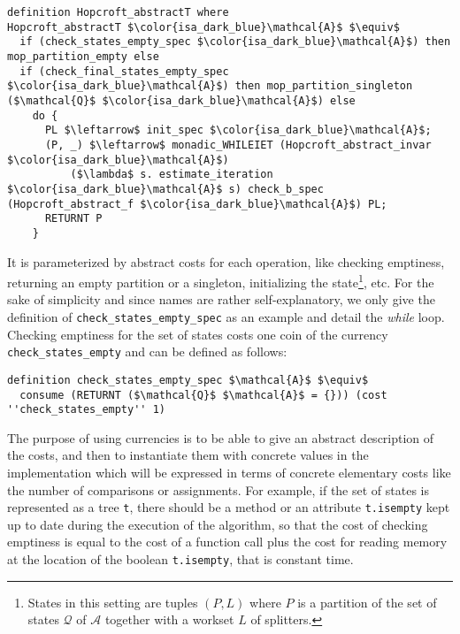 \documentclass[12pt, a4 paper]{article}
\theoremstyle{definition}
\begin{document}
\noindent
\begin{minipage}{\linewidth}
\begin{lstlisting}[language=Isabelle]
definition Hopcroft_abstractT where
Hopcroft_abstractT $\color{isa_dark_blue}\mathcal{A}$ $\equiv$
  if (check_states_empty_spec $\color{isa_dark_blue}\mathcal{A}$) then mop_partition_empty else 
  if (check_final_states_empty_spec $\color{isa_dark_blue}\mathcal{A}$) then mop_partition_singleton ($\mathcal{Q}$ $\color{isa_dark_blue}\mathcal{A}$) else
    do {
      PL $\leftarrow$ init_spec $\color{isa_dark_blue}\mathcal{A}$;
      (P, _) $\leftarrow$ monadic_WHILEIET (Hopcroft_abstract_invar $\color{isa_dark_blue}\mathcal{A}$) 
          ($\lambda$ s. estimate_iteration $\color{isa_dark_blue}\mathcal{A}$ s) check_b_spec (Hopcroft_abstract_f $\color{isa_dark_blue}\mathcal{A}$) PL;
      RETURNT P
    }
\end{lstlisting}
\end{minipage}

It is parameterized by abstract costs for each operation, like checking emptiness, returning an empty partition or a singleton, initializing the state\footnote{States in this setting are tuples $(P, L)$ where $P$ is a partition of the set of states $\mathcal{Q}$ of $\mathcal{A}$ together with a workset $L$ of splitters.}, etc.
For the sake of simplicity and since names are rather self-explanatory, we only give the definition of \texttt{check\_states\_empty\_spec} as an example and detail the \textit{while} loop. Checking emptiness for the set of states costs one coin of the currency \texttt{check\_states\_empty} and can be defined as follows:

\begin{lstlisting}[language=Isabelle]
definition check_states_empty_spec $\mathcal{A}$ $\equiv$
  consume (RETURNT ($\mathcal{Q}$ $\mathcal{A}$ = {})) (cost ''check_states_empty'' 1)
\end{lstlisting}

The purpose of using currencies is to be able to give an abstract description of the costs, and then to instantiate them with concrete values in the implementation which will be expressed in terms of concrete elementary costs like the number of comparisons or assignments. For example, if the set of states is represented as a tree \texttt{t}, there should be a method or an attribute \texttt{t.isempty} kept up to date during the execution of the algorithm, so that the cost of checking emptiness is equal to the cost of a function call plus the cost for reading memory at the location of the boolean \texttt{t.isempty}, that is constant time.
\end{document}
